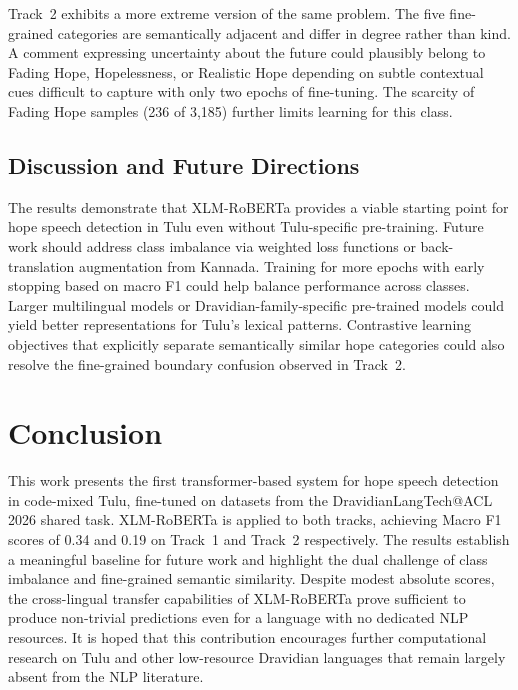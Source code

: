 \documentclass[11pt]{article}
\begin{document}
Track~2 exhibits a more extreme version of the
same problem. The five fine-grained categories are
semantically adjacent and differ in degree rather
than kind. A comment expressing uncertainty
about the future could plausibly belong to Fading
Hope, Hopelessness, or Realistic Hope depending
on subtle contextual cues difficult to capture with
only two epochs of fine-tuning. The scarcity of
Fading Hope samples (236 of 3,185) further limits
learning for this class.

\subsection{Discussion and Future Directions}

The results demonstrate that XLM-RoBERTa provides a viable starting point for hope speech detection in Tulu even without Tulu-specific pre-training.
Future work should address class imbalance via
weighted loss functions or back-translation augmentation from Kannada. Training for more
epochs with early stopping based on macro F1
could help balance performance across classes.
Larger multilingual models or Dravidian-family-specific pre-trained models could yield better representations for Tulu's lexical patterns. Contrastive
learning objectives that explicitly separate semantically similar hope categories could also resolve
the fine-grained boundary confusion observed in
Track~2.

\vspace{-2pt}
\section{Conclusion}

This work presents the first transformer-based
system for hope speech detection in code-mixed
Tulu, fine-tuned on datasets from the DravidianLangTech@ACL 2026 shared task. XLM-RoBERTa is applied to both tracks, achieving
Macro F1 scores of 0.34 and 0.19 on Track~1
and Track~2 respectively. The results establish
a meaningful baseline for future work and highlight the dual challenge of class imbalance and
fine-grained semantic similarity. Despite modest
absolute scores, the cross-lingual transfer capabilities of XLM-RoBERTa prove sufficient to produce
non-trivial predictions even for a language with
no dedicated NLP resources. It is hoped that this
contribution encourages further computational research on Tulu and other low-resource Dravidian
languages that remain largely absent from the NLP
literature.
\end{document}

